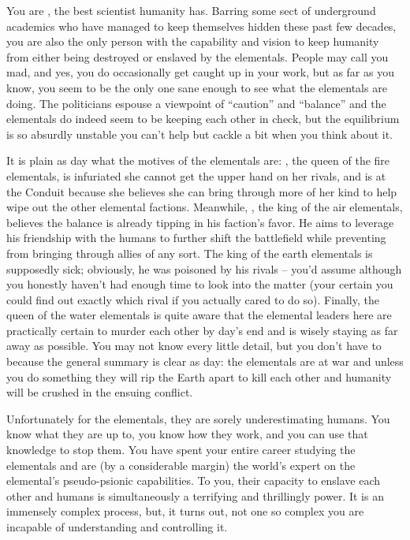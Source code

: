 \documentclass[char]{elementals}
\begin{document}
\name{\cMS{}}

You are \cMS{\intro}, the best scientist humanity has. Barring some sect of underground academics who have managed to keep themselves hidden these past few decades, you are also the only person with the capability and vision to keep humanity from either being destroyed or enslaved by the elementals. People may call you mad, and yes, you do occasionally get caught up in your work, but as far as you know, you seem to be the only one sane enough to see what the elementals are doing. The politicians espouse a viewpoint of ``caution'' and ``balance'' and the elementals do indeed seem to be keeping each other in check, but the equilibrium is so absurdly unstable you can't help but cackle a bit when you think about it.


It is plain as day what the motives of the elementals are: \cQueen{\intro}, the queen of the fire elementals, is infuriated she cannot get the upper hand on her rivals, and is at the Conduit because she believes she can bring through more of her kind to help wipe out the other elemental factions. Meanwhile, \cKing{\intro}, the king of the air elementals, believes the balance is already tipping in his faction's favor. He aims to leverage his friendship with the humans to further shift the battlefield while preventing \cQueen{} from bringing through allies of any sort. The king of the earth elementals is supposedly sick; obviously, he was poisoned by his rivals -- you'd assume \cKing{} although you honestly haven't had enough time to look into the matter (your certain you could find out exactly which rival if you actually cared to do so). Finally, the queen of the water elementals is quite aware that the elemental leaders here are practically certain to murder each other by day's end and is wisely staying as far away as possible. You may not know every little detail, but you don't have to because the general summary is clear as day: the elementals are at war and unless you do something they will rip the Earth apart to kill each other and humanity will be crushed in the ensuing conflict.

Unfortunately for the elementals, they are sorely underestimating humans. You know what they are up to, you know how they work, and you can use that knowledge to stop them. You have spent your entire career studying the elementals and are (by a considerable margin) the world's expert on the elemental's pseudo-psionic capabilities. To you, their capacity to enslave each other and humans is simultaneously a terrifying and thrillingly power. It is an immensely complex process, but, it turns out, not one so complex you are incapable of understanding and controlling it. 
\end{document}
